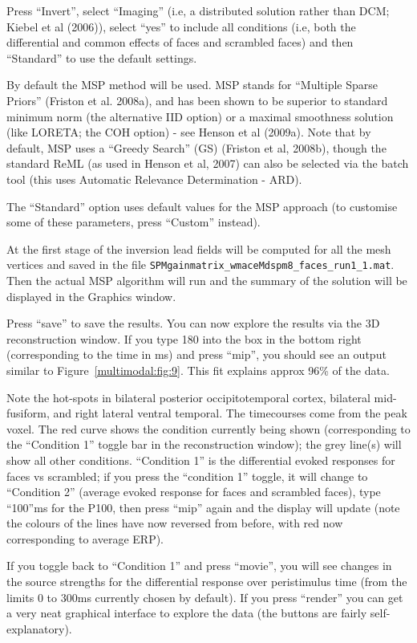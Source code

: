 Press ``Invert'', select ``Imaging'' (i.e, a distributed solution rather than DCM; Kiebel et al (2006)), select ``yes'' to include all conditions (i.e, both the differential and common effects of faces and scrambled faces) and then ``Standard'' to use the default settings.

By default the MSP method will be used. MSP stands for ``Multiple Sparse Priors'' (Friston et al. 2008a), and has been shown to be superior to standard minimum norm (the alternative IID option) or a maximal smoothness solution (like LORETA; the COH option) - see Henson et al (2009a). Note that by default, MSP uses a ``Greedy Search'' (GS) (Friston et al, 2008b), though the standard ReML (as used in Henson et al, 2007) can also be selected via the batch tool (this uses Automatic Relevance Determination - ARD).

The ``Standard'' option uses default values for the MSP approach (to customise some of these parameters, press ``Custom'' instead).

At the first stage of the inversion lead fields will be computed for all the mesh vertices and saved in the file \texttt{SPMgainmatrix\_wmaceMdspm8\_faces\_run1\_1.mat}. Then the actual MSP algorithm will run and the summary of the solution will be displayed in the Graphics window.

Press ``save'' to save the results. You can now explore the results via the 3D reconstruction window. If you type 180 into the box in the bottom right (corresponding to the time in ms) and press ``mip'', you should see an output similar to Figure~\ref{multimodal:fig:9}. This fit explains approx 96\% of the data.

Note the hot-spots in bilateral posterior occipitotemporal cortex, bilateral mid-fusiform, and right lateral ventral temporal. The timecourses come from the peak voxel. The red curve shows the condition currently being shown (corresponding to the ``Condition 1'' toggle bar in the reconstruction window); the grey line(s) will show all other conditions. ``Condition 1'' is the differential evoked responses for faces vs scrambled; if you press the ``condition 1'' toggle, it will change to ``Condition 2'' (average evoked response for faces and scrambled faces), type ``100''ms for the P100, then press ``mip'' again and the display will update (note the colours of the lines have now reversed from before, with red now corresponding to average ERP). 


If you toggle back to ``Condition 1'' and press ``movie'', you will see changes in the source strengths for the differential response over peristimulus time (from the limits 0 to 300ms currently chosen by default).
If you press ``render'' you can get a very neat graphical interface to explore the data (the buttons are fairly self-explanatory). 

